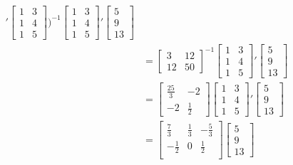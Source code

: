 \documentclass[10pt]{article}
\begin{document}
\begin{enumerate}[1)]
\begin{align*}
'
  \begin{bmatrix}
    1 & 3\\
    1 & 4\\
    1 & 5
  \end{bmatrix}
)^{-1}
  \begin{bmatrix}
    1 & 3\\
    1 & 4\\
    1 & 5
  \end{bmatrix}
'
  \begin{bmatrix}
    5\\
    9\\
    13
  \end{bmatrix}
\\
&=
  \begin{bmatrix}
    3 & 12\\
    12 & 50
  \end{bmatrix}
^{-1}
  \begin{bmatrix}
    1 & 3\\
    1 & 4\\
    1 & 5
  \end{bmatrix}
'
  \begin{bmatrix}
    5\\
    9\\
    13
  \end{bmatrix}
\\
&=
  \begin{bmatrix}
    \frac{25}{3} & -2\\
    -2 & \frac{1}{2}
  \end{bmatrix}
  \begin{bmatrix}
    1 & 3\\
    1 & 4\\
    1 & 5
  \end{bmatrix}
'
  \begin{bmatrix}
    5\\
    9\\
    13
  \end{bmatrix}
\\
&=
  \begin{bmatrix}
    \frac{7}{3} & \frac{1}{3} & -\frac{5}{3}\\
    -\frac{1}{2} & 0 & \frac{1}{2}\\
  \end{bmatrix}
  \begin{bmatrix}
    5\\
    9\\
    13
  \end{bmatrix}
\\

\end{align*}
\end{enumerate}
\end{document}
